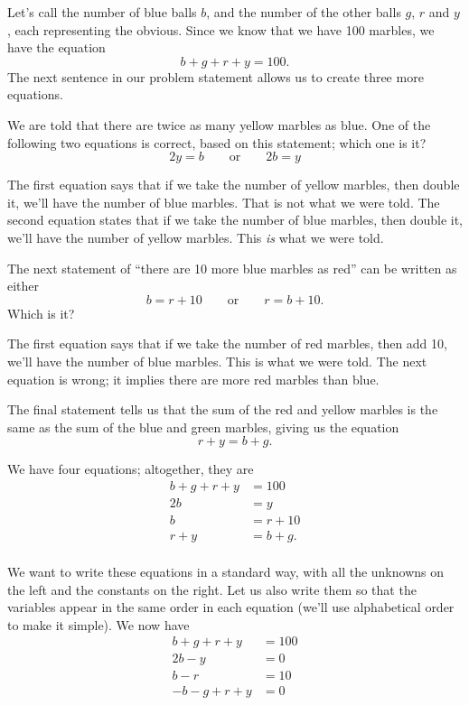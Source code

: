 {Let's call the number of blue balls $b$, and the number of the other balls $g$, $r$ and $y$, each representing the obvious. Since we know that we have 100 marbles, we have the equation $$b+g+r+y=100.$$ The next sentence in our problem statement allows us to create three more equations. 

We are told that there are twice as many yellow marbles as blue. One of the following two equations is correct, based on this statement; which one is it? $$2y=b \quad\quad \text{or} \quad\quad2b=y$$


The first equation says that if we take the number of yellow marbles, then double it, we'll have the number of blue marbles. That is not what we were told. The second equation states that if we take the number of blue marbles, then double it, we'll have the number of yellow marbles. This \textit{is} what we were told.

The next statement of ``there are 10 more blue marbles as red'' can be written as either $$b=r+10 \quad\quad \text{or} \quad\quad r=b+10.$$ Which is it?

The first equation says that if we take the number of red marbles, then add 10, we'll have the number of blue marbles. This is what we were told. The next equation is wrong; it implies there are more red marbles than blue.

The final statement tells us that the sum of the red and yellow marbles is the same as the sum of the blue and green marbles, giving us the equation $$r+y=b+g.$$

We have four equations; altogether, they are \begin{align*} b+g+r+y&= 100\\ 2b&=y\\ b&=r+10\\ r+y&=b+g.\\ \end{align*}

We want to write these equations in a standard way, with all the unknowns on the left and the constants on the right. Let us also write them so that the variables appear in the same order in each equation (we'll use alphabetical order to make it simple). We now have \begin{align*} b+g+r+y&=100\\2b-y&=0\\b-r&=10\\-b-g+r+y&=0\\ \end{align*}

}
